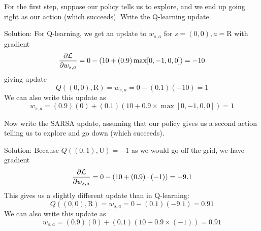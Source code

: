 \documentclass[12pt]{article}
\begin{document}
\noindent {}

\vspace{.5pc}

For the first step, suppose our policy tells us to explore, and we end up going right as our action (which succeeds). Write the Q-learning update.
\medskip

\begin{solution}
\noindent Solution: For Q-learning, we get an update to $w_{s,a}$ for $s=(0,0), a=\text{R}$ with gradient
$$\frac{\partial \mathcal{L}}{\partial w_{s,a}} = 0 - (10 + (0.9) \max [0,-1,0,0] )= -10$$
giving update
$$Q((0,0), \text{R}) = w_{s,a} = 0 - (0.1)(-10) = 1$$
We can also write this update as
$$w_{s,a} = (0.9)(0) + (0.1)(10 + 0.9 \times \max[0,-1,0,0]) = 1$$

\end{solution}
\vspace{10cm}

\vspace{.5cm}
\bigskip

Now write the SARSA update, assuming that our policy gives us a second action telling us to explore and go down (which succeeds).
\bigskip

\begin{solution}
\noindent Solution: Because $Q((0,1), \text{U}) = -1$ as we would go off the grid, we have gradient
$$\frac{\partial \mathcal{L}}{\partial w_{s,a}} = 0 - (10 + (0.9) \cdot (-1)) = -9.1$$
This gives us a slightly different update than in Q-learning:
$$Q((0,0), \text{R}) = w_{s,a} = 0 - (0.1)(-9.1) = 0.91$$
We can also write this update as
$$w_{s,a} = (0.9)(0) + (0.1)(10 + 0.9 \times (-1)) = 0.91$$
\end{solution}
\end{document}
